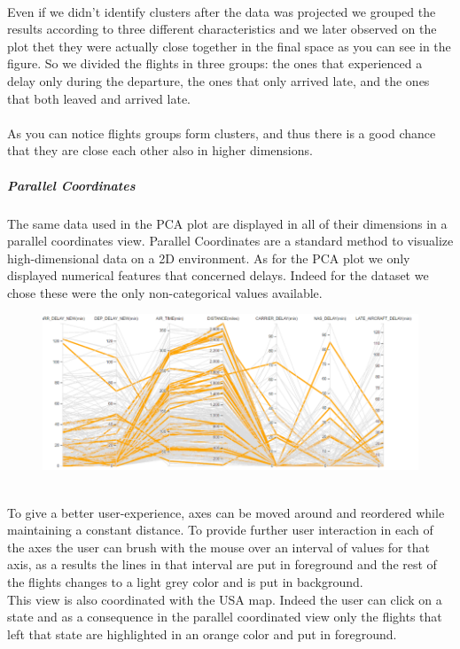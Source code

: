 \documentclass[a4paper, 12pt]{article}
\begin{document}
\\ 
Even if we didn't identify clusters after the data was projected we grouped the results according to
three different characteristics and we later observed on the plot thet they were actually close
together in the final space as you can see in the figure. So we divided the flights in three groups: the
ones that experienced a delay only during the departure, the ones that only arrived late, and the ones
that both leaved and arrived late.
\\
\\
As you can notice flights groups form clusters, and thus there is a good chance that
they are close each other also in higher dimensions.
\clearpage

\subparagraph{Parallel Coordinates}
The same data used in the PCA plot are displayed in all of their dimensions in a parallel coordinates
view. Parallel Coordinates are a standard method to visualize high-dimensional data on a 2D environment. 
As for the PCA plot we only displayed numerical features that concerned delays. Indeed for the dataset we
chose these were the only non-categorical values available.
\\
\begin{figure}[h]	
\centering
\includegraphics[scale=0.7]{pc.PNG}
\end{figure}\\
To give a better user-experience, axes can be moved around and reordered while maintaining a constant 
distance. To provide further user interaction in each of the axes the user can brush with the mouse over
an interval of values for that axis, as a results the lines in that interval are put in foreground and
the rest of the flights changes to a light grey color and is put in background.
\\
This view is also coordinated with the USA map. Indeed the user can click on a state and as a 
consequence in the parallel coordinated view only the flights that left that state are highlighted in an
orange color and put in foreground.
\end{document}
